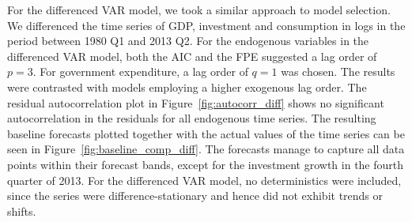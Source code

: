 For the differenced VAR model, we took a similar approach to model selection. We differenced the time series of GDP, investment and consumption in logs in the period between 1980 Q1 and 2013 Q2. For the endogenous variables in the differenced VAR model, both the AIC and the FPE suggested a lag order of $p=3$. For government expenditure, a lag order of $q=1$ was chosen. The results were contrasted with models employing a higher exogenous lag order. The residual autocorrelation plot in Figure~\ref{fig:autocorr_diff} shows no significant autocorrelation in the residuals for all endogenous time series. The resulting baseline forecasts plotted together with the actual values of the time series can be seen in Figure~\ref{fig:baseline_comp_diff}. The forecasts manage to capture all data points within their forecast bands, except for the investment growth in the fourth quarter of 2013. For the differenced VAR model, no deterministics were included, since the series were difference-stationary and hence did not exhibit trends or shifts.




%

%

